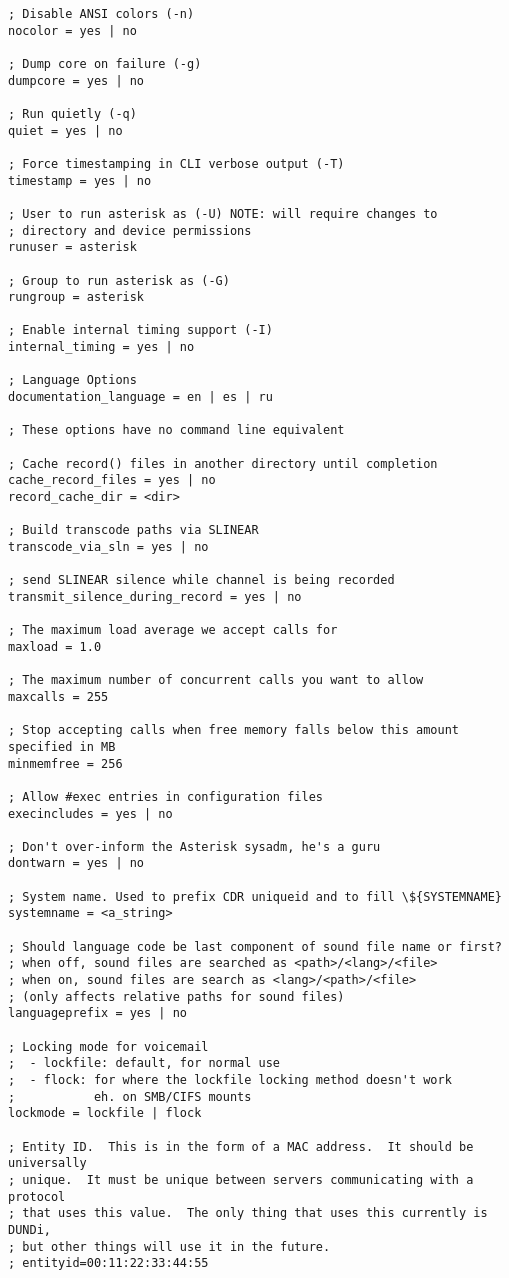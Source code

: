 \begin{astlisting}
\begin{verbatim}
; Disable ANSI colors (-n)
nocolor = yes | no

; Dump core on failure (-g)
dumpcore = yes | no

; Run quietly (-q)
quiet = yes | no

; Force timestamping in CLI verbose output (-T)
timestamp = yes | no

; User to run asterisk as (-U) NOTE: will require changes to
; directory and device permissions
runuser = asterisk				

; Group to run asterisk as (-G)
rungroup = asterisk

; Enable internal timing support (-I)
internal_timing = yes | no

; Language Options
documentation_language = en | es | ru

; These options have no command line equivalent

; Cache record() files in another directory until completion
cache_record_files = yes | no			
record_cache_dir = <dir>

; Build transcode paths via SLINEAR
transcode_via_sln = yes | no 			

; send SLINEAR silence while channel is being recorded
transmit_silence_during_record = yes | no

; The maximum load average we accept calls for
maxload = 1.0

; The maximum number of concurrent calls you want to allow
maxcalls = 255 

; Stop accepting calls when free memory falls below this amount specified in MB
minmemfree = 256

; Allow #exec entries in configuration files
execincludes = yes | no

; Don't over-inform the Asterisk sysadm, he's a guru
dontwarn = yes | no

; System name. Used to prefix CDR uniqueid and to fill \${SYSTEMNAME}
systemname = <a_string>

; Should language code be last component of sound file name or first?
; when off, sound files are searched as <path>/<lang>/<file>
; when on, sound files are search as <lang>/<path>/<file>
; (only affects relative paths for sound files)
languageprefix = yes | no			

; Locking mode for voicemail
;  - lockfile: default, for normal use
;  - flock: for where the lockfile locking method doesn't work
;           eh. on SMB/CIFS mounts
lockmode = lockfile | flock
  
; Entity ID.  This is in the form of a MAC address.  It should be universally
; unique.  It must be unique between servers communicating with a protocol
; that uses this value.  The only thing that uses this currently is DUNDi,
; but other things will use it in the future.
; entityid=00:11:22:33:44:55


\end{verbatim}
\end{astlisting}
